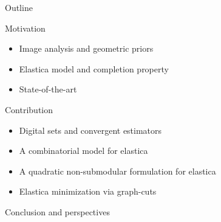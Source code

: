 \begin{frame}
	{Outline}

\begin{enumerate}
	{
	\item{Motivation}
	\begin{itemize}
		\item{Image analysis and geometric priors}
		\item{Elastica model and completion property}		
		\item{State-of-the-art}							
	\end{itemize}}
	\vspace{1em}
	\item{Contribution}
	\begin{itemize}
		\item{Digital sets and convergent estimators}		
		\item{A combinatorial model for elastica}
		\item{A quadratic non-submodular formulation for elastica}	
		\item{Elastica minimization via graph-cuts}	
	\end{itemize}
	\vspace{1em}
	\item{Conclusion and perspectives}
\end{enumerate}
\end{frame}
